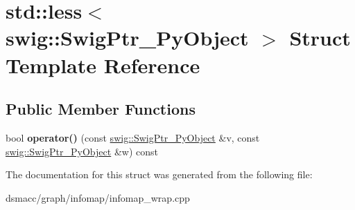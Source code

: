 \hypertarget{structstd_1_1less_3_01swig_1_1SwigPtr__PyObject_01_4}{}\section{std\+:\+:less$<$ swig\+:\+:Swig\+Ptr\+\_\+\+Py\+Object $>$ Struct Template Reference}
\label{structstd_1_1less_3_01swig_1_1SwigPtr__PyObject_01_4}
\subsection*{Public Member Functions}
\begin{DoxyCompactItemize}
\item 
\mbox{\label{structstd_1_1less_3_01swig_1_1SwigPtr__PyObject_01_4_a4f69d736de91a5450e95bcee12b5b512}} 
bool {\bfseries operator()} (const \mbox{\hyperlink{classswig_1_1SwigPtr__PyObject}{swig\+::\+Swig\+Ptr\+\_\+\+Py\+Object}} \&v, const \mbox{\hyperlink{classswig_1_1SwigPtr__PyObject}{swig\+::\+Swig\+Ptr\+\_\+\+Py\+Object}} \&w) const
\end{DoxyCompactItemize}


The documentation for this struct was generated from the following file\+:\begin{DoxyCompactItemize}
\item 
dsmacc/graph/infomap/infomap\+\_\+wrap.\+cpp\end{DoxyCompactItemize}
